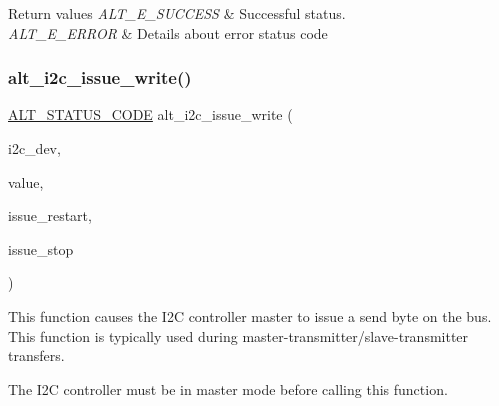 \begin{DoxyRetVals}{Return values}
{\em A\+L\+T\+\_\+\+E\+\_\+\+S\+U\+C\+C\+E\+SS} & Successful status. \\
\hline
{\em A\+L\+T\+\_\+\+E\+\_\+\+E\+R\+R\+OR} & Details about error status code \\
\hline
\end{DoxyRetVals}
\mbox{\label{group__ALT__I2C_ga25b161ac5d073c8f1ba5ad3bb822b951}} 
\subsubsection{\texorpdfstring{alt\_i2c\_issue\_write()}{alt\_i2c\_issue\_write()}}
{\footnotesize\ttfamily \mbox{\hyperlink{hwlib_8h_abdb0d369f069723ca55d6c94bcaaaa12}{A\+L\+T\+\_\+\+S\+T\+A\+T\+U\+S\+\_\+\+C\+O\+DE}} alt\+\_\+i2c\+\_\+issue\+\_\+write (\begin{DoxyParamCaption}\item[{\mbox{\hyperlink{structALT__I2C__DEV__s}{A\+L\+T\+\_\+\+I2\+C\+\_\+\+D\+E\+V\+\_\+t}} $\ast$}]{i2c\+\_\+dev,  }\item[{const uint8\+\_\+t}]{value,  }\item[{const bool}]{issue\+\_\+restart,  }\item[{const bool}]{issue\+\_\+stop }\end{DoxyParamCaption})}

This function causes the I2C controller master to issue a send byte on the bus. This function is typically used during master-\/transmitter/slave-\/transmitter transfers.

The I2C controller must be in master mode before calling this function.



